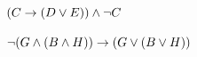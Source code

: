 \begin{practiceproblems}
\begin{problemslist}
	\item $(C \rightarrow (D \vee E)) \mathbin{\wedge} \neg C$
	
	
	\item $\neg(G \mathbin{\wedge} (B \mathbin{\wedge} H)) \rightarrow (G \vee (B \vee H))$
	
	

\end{problemslist}
\end{practiceproblems}
